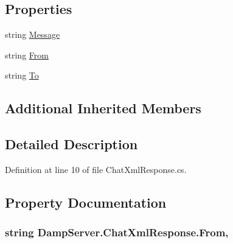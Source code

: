 \subsection*{Properties}
\begin{DoxyCompactItemize}
\item 
string \hyperlink{class_damp_server_1_1_chat_xml_response_af43fcfc48861b155ee9d12c9b33e7cca}{Message}
\item 
string \hyperlink{class_damp_server_1_1_chat_xml_response_a7c368385b847a62b9fd611f4ad9ae6ea}{From}
\item 
string \hyperlink{class_damp_server_1_1_chat_xml_response_afda55355aa73ff168a1e26b9331699ed}{To}
\end{DoxyCompactItemize}
\subsection*{Additional Inherited Members}


\subsection{Detailed Description}


Definition at line 10 of file Chat\-Xml\-Response.\-cs.



\subsection{Property Documentation}
\hypertarget{class_damp_server_1_1_chat_xml_response_a7c368385b847a62b9fd611f4ad9ae6ea}{
\subsubsection[{From}]{\setlength{\rightskip}{0pt plus 5cm}string Damp\-Server.\-Chat\-Xml\-Response.\-From\hspace{0.3cm}{\ttfamily [get]}, {\ttfamily [set]}}}\label{class_damp_server_1_1_chat_xml_response_a7c368385b847a62b9fd611f4ad9ae6ea}


